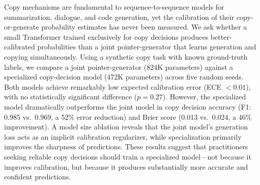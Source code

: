 Copy mechanisms are fundamental to sequence-to-sequence models for summarization, dialogue, and code generation, yet the calibration of their copy-or-generate probability estimates has never been measured. We ask whether a small Transformer trained exclusively for copy decisions produces better-calibrated probabilities than a joint pointer-generator that learns generation and copying simultaneously. Using a synthetic copy task with known ground-truth labels, we compare a joint pointer-generator (824K parameters) against a specialized copy-decision model (472K parameters) across five random seeds. Both models achieve remarkably low expected calibration error (ECE $< 0.01$), with no statistically significant difference ($p = 0.27$). However, the specialized model dramatically outperforms the joint model in copy decision accuracy (F1: 0.985 vs.\ 0.969, a 52\% error reduction) and Brier score (0.013 vs.\ 0.024, a 46\% improvement). A model size ablation reveals that the joint model's generation loss acts as an implicit calibration regularizer, while specialization primarily improves the sharpness of predictions. These results suggest that practitioners seeking reliable copy decisions should train a specialized model---not because it improves calibration, but because it produces substantially more accurate and confident predictions.